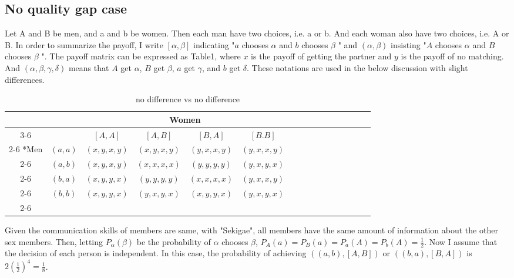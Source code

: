 \documentclass{article}
\begin{document}
	\subsection{No quality gap case}
	\par
	Let A and B be men, and a and b be women. Then each man have two choices, i.e. a or b. And each woman also have two choices, i.e. A or B. In order to summarize the payoff, I write $[\alpha, \beta]$ indicating "$a$ chooses $\alpha$ and $b$ chooses $\beta$ " and $(\alpha, \beta)$ insisting "$A$ chooses $\alpha$ and $B$ chooses $\beta$ ". The payoff matrix can be expressed as Table1, where $x$ is the payoff of getting the partner and $y$ is the payoff of no matching. And $(\alpha, \beta, \gamma, \delta)$ means that $A$ get $\alpha$, $B$ get $\beta$, $a$ get $\gamma$, and $b$ get $\delta$. These notations are used in the below discussion with slight differences.
	\begin{table}[h]
	\begin{center}
                \setlength{\extrarowheight}{2pt}
                \begin{tabular}{*{16}{c|}}
                  \multicolumn{2}{c}{} & \multicolumn{1}{c}{} & \multicolumn{2}{c}{Women}\\\cline{3-6}
                  \multicolumn{1}{c}{} &  & $[A, A]$  & $[A, B]$ & $[B, A]$ & $[B.B]$\\\cline{2-6}
                  \multirow{4}*{Men}  & $(a,a)$ & $(x,y,x,y)$ & $(x,y,x,y)$ & $(y,x,x,y)$ & $(y,x,x,y)$\\\cline{2-6}
                  & $(a,b)$ & $(x,y,x,y)$ & $(x,x,x,x)$ & $(y,y,y,y)$ & $(y,x,y,x)$\\\cline{2-6}
                  & $(b,a)$ & $(x,y,y,x)$ & $(y,y,y,y)$ & $(x,x,x,x)$ & $(y,x,x,y)$\\\cline{2-6}
                  & $(b,b)$ & $(x,y,y,x)$ & $(y,x,y,x)$ & $(x,y,y,x)$ & $(y,x,y,x)$\\\cline{2-6}
                \end{tabular}
        \end{center}
        \caption{no difference vs no difference}
  	\end{table}
	\par
	Given the communication skills of members are same, with "Sekigae", all members have the same amount of information about the other sex members. Then, letting $P_\alpha(\beta)$ be the probability of $\alpha$ chooses $\beta$, $P_A(a)= P_B(a) = P_a(A) = P_b(A) = \frac{1}{2}$. Now I assume that the decision of each person is independent. In this case, the probability of achieving $\left( (a, b), [A, B] \right)$ or $\left( (b, a), [B, A] \right)$ is $2 \left(\frac{1}{2}\right)^4 = \frac{1}{8}$.
\end{document}
